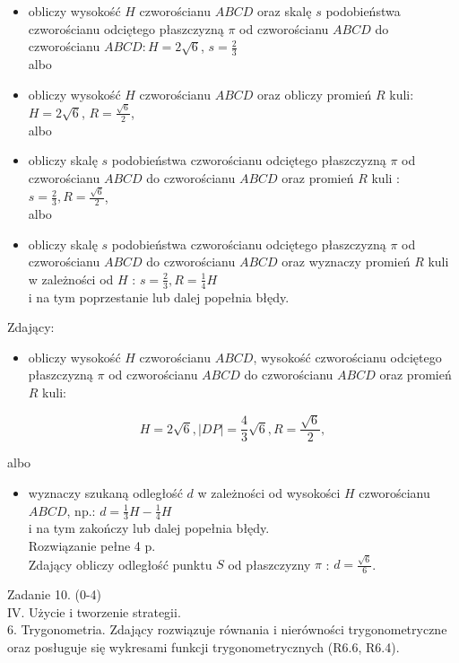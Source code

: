 \documentclass[10pt]{article}
\begin{document}
\begin{itemize}
  \item obliczy wysokość $H$ czworościanu $A B C D$ oraz skalę $s$ podobieństwa czworościanu odciętego płaszczyzną $\pi$ od czworościanu $A B C D$ do czworościanu $A B C D: H=2 \sqrt{6}$, $s=\frac{2}{3}$\\
albo
  \item obliczy wysokość $H$ czworościanu $A B C D$ oraz obliczy promień $R$ kuli: $H=2 \sqrt{6}$, $R=\frac{\sqrt{6}}{2}$,\\
albo
  \item obliczy skalę $s$ podobieństwa czworościanu odciętego płaszczyzną $\pi$ od czworościanu $A B C D$ do czworościanu $A B C D$ oraz promień $R$ kuli : $s=\frac{2}{3}, R=\frac{\sqrt{6}}{2}$,\\
albo
  \item obliczy skalę $s$ podobieństwa czworościanu odciętego płaszczyzną $\pi$ od czworościanu $A B C D$ do czworościanu $A B C D$ oraz wyznaczy promień $R$ kuli w zależności od $H$ : $s=\frac{2}{3}, R=\frac{1}{4} H$\\
i na tym poprzestanie lub dalej popełnia błędy.
\end{itemize}

Zdający:

\begin{itemize}
  \item obliczy wysokość $H$ czworościanu $A B C D$, wysokość czworościanu odciętego płaszczyzną $\pi$ od czworościanu $A B C D$ do czworościanu $A B C D$ oraz promień $R$ kuli:
\end{itemize}

$$
H=2 \sqrt{6},|D P|=\frac{4}{3} \sqrt{6}, R=\frac{\sqrt{6}}{2},
$$

albo

\begin{itemize}
  \item wyznaczy szukaną odległość $d$ w zależności od wysokości $H$ czworościanu $A B C D$, np.: $d=\frac{1}{3} H-\frac{1}{4} H$\\
i na tym zakończy lub dalej popełnia błędy.\\
Rozwiązanie pełne 4 p.\\
Zdający obliczy odległość punktu $S$ od płaszczyzny $\pi$ : $d=\frac{\sqrt{6}}{6}$.
\end{itemize}

Zadanie 10. (0-4)\\
IV. Użycie i tworzenie strategii.\\
6. Trygonometria. Zdający rozwiązuje równania i nierówności trygonometryczne oraz posługuje się wykresami funkcji trygonometrycznych (R6.6, R6.4).
\end{document}
